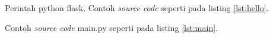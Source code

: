 Perintah python flask. Contoh \textit{source code} seperti pada listing \ref{lst:hello}.

 Contoh \textit{source code} main.py seperti pada listing \ref{lst:main}.

